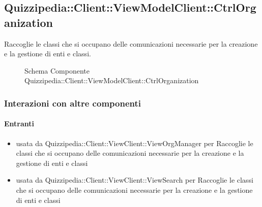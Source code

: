 \subsection{Quizzipedia::Client::ViewModelClient::CtrlOrganization}
Raccoglie le classi che si occupano delle comunicazioni necessarie per la creazione e la gestione di enti e classi.
\begin{figure}[H]
\centering
\noindent{}
\caption[Schema Componente Quizzipedia::Client::ViewModelClient::CtrlOrganization]{Schema Componente Quizzipedia::Client::ViewModelClient::CtrlOrganization}
\end{figure}
\subsubsection{Interazioni con altre componenti}
\paragraph{Entranti}
\begin{itemize}
\item usata da Quizzipedia::Client::ViewClient::ViewOrgManager per Raccoglie le classi che si occupano delle comunicazioni necessarie per la creazione e la gestione di enti e classi
\item usata da Quizzipedia::Client::ViewClient::ViewSearch per Raccoglie le classi che si occupano delle comunicazioni necessarie per la creazione e la gestione di enti e classi
\end{itemize}
